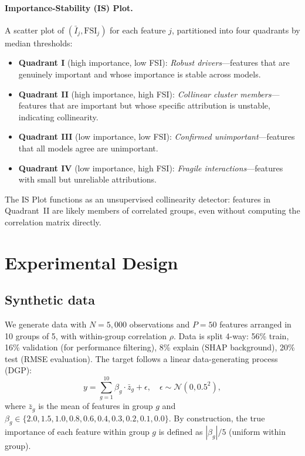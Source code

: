 \documentclass[10pt]{article}
\newcommand{\rhovar}{\rho}
\begin{document}
\paragraph{Importance-Stability (IS) Plot.}
A scatter plot of $(\bar{I}_j, \text{FSI}_j)$ for each feature $j$,
partitioned into four quadrants by median thresholds:
\begin{itemize}
  \item \textbf{Quadrant I} (high importance, low FSI): \emph{Robust
    drivers}---features that are genuinely important and whose importance
    is stable across models.
  \item \textbf{Quadrant II} (high importance, high FSI): \emph{Collinear
    cluster members}---features that are important but whose specific
    attribution is unstable, indicating collinearity.
  \item \textbf{Quadrant III} (low importance, low FSI): \emph{Confirmed
    unimportant}---features that all models agree are unimportant.
  \item \textbf{Quadrant IV} (low importance, high FSI): \emph{Fragile
    interactions}---features with small but unreliable attributions.
\end{itemize}

The IS Plot functions as an unsupervised collinearity detector: features
in Quadrant~II are likely members of correlated groups, even without
computing the correlation matrix directly.


\section{Experimental Design}
\label{sec:experiments}

\subsection{Synthetic data}

We generate data with $N = 5{,}000$ observations and $P = 50$ features
arranged in 10 groups of 5, with within-group correlation $\rhovar$.
Data is split 4-way: 56\% train, 16\% validation (for performance
filtering), 8\% explain (SHAP background), 20\% test (RMSE evaluation).
The target follows a linear data-generating process (DGP):
\begin{equation}
  y = \sum_{g=1}^{10} \beta_g \cdot \bar{z}_g + \epsilon,
  \quad \epsilon \sim \mathcal{N}(0, 0.5^2),
\end{equation}
where $\bar{z}_g$ is the mean of features in group $g$ and
$\beta_g \in \{2.0, 1.5, 1.0, 0.8, 0.6, 0.4, 0.3, 0.2, 0.1, 0.0\}$.
By construction, the true importance of each feature within group $g$ is
defined as $|\beta_g|/5$ (uniform within group).
\end{document}

